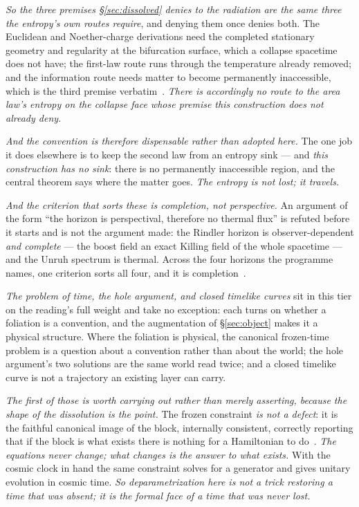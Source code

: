 \documentclass[11pt,a4paper]{article}
\theoremstyle{plain}
\theoremstyle{definition}
\begin{document}
\emph{So the three premises \S\ref{sec:dissolved} denies to the radiation are the same three the entropy's
own routes require}, and denying them once denies both. The Euclidean and Noether-charge derivations need
the completed stationary geometry and regularity at the bifurcation surface, which a collapse spacetime does
not have; the first-law route runs through the temperature already removed; and the information route needs
matter to become permanently inaccessible, which is the third premise
verbatim~\cite{JanzenBHcausality}. \emph{There is accordingly no route to the area law's entropy on the
collapse face whose premise this construction does not already deny.}

\emph{And the convention is therefore dispensable rather than adopted here.} The one job it does elsewhere is
to keep the second law from an entropy sink --- and \emph{this construction has no sink}: there is no
permanently inaccessible region, and the central theorem says where the matter goes. \emph{The entropy is not
lost; it travels.}

\emph{And the criterion that sorts these is completion, not perspective.} An argument of the form ``the
horizon is perspectival, therefore no thermal flux'' is refuted before it starts and is not the argument
made: the Rindler horizon is observer-dependent \emph{and complete} --- the boost field an exact Killing
field of the whole spacetime --- and the Unruh spectrum is thermal. Across the four horizons the programme
names, one criterion sorts all four, and it is
completion~\cite{JanzenBHcausality}.

\emph{The problem of time, the hole argument, and closed timelike curves} sit in this tier on the reading's
full weight and take no exception: each turns on whether a foliation is a convention, and the augmentation of
\S\ref{sec:object} makes it a physical structure. Where the foliation is physical, the canonical frozen-time problem is a question
about a convention rather than about the world; the hole argument's two solutions are the same world read
twice; and a closed timelike curve is not a trajectory an existing layer can carry.

\emph{The first of those is worth carrying out rather than merely asserting, because the shape of the
dissolution is the point.} The frozen constraint \emph{is not a defect}: it is the faithful canonical image
of the block, internally consistent, correctly reporting that if the block is what exists there is nothing
for a Hamiltonian to do~\cite{JanzenCanonicalTime}. \emph{The equations never change; what changes is the
answer to what exists.} With the cosmic clock in hand the same constraint solves for a generator and gives
unitary evolution in cosmic time. \emph{So deparametrization here is not a trick restoring a time that was
absent; it is the formal face of a time that was never lost.}
\end{document}
